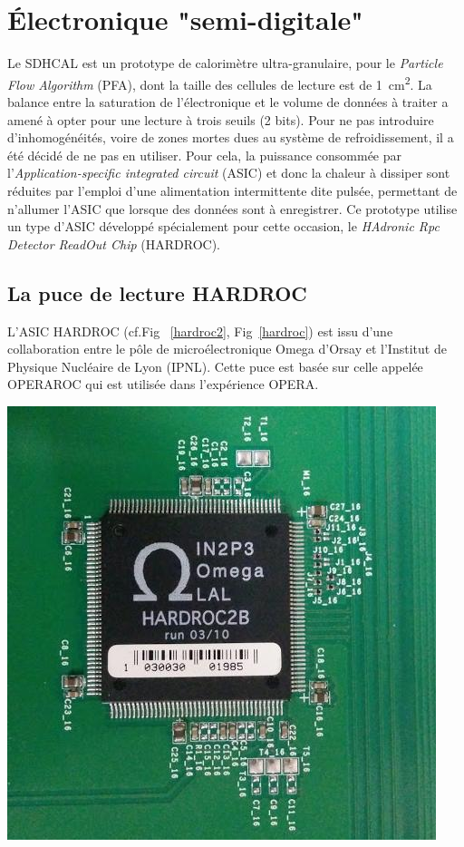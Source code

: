 \section{Électronique "semi-digitale"}
Le SDHCAL est un prototype de calorimètre ultra-granulaire, pour le \textit{Particle Flow Algorithm} (PFA), dont la taille des cellules de lecture est de \SI{1}{\square\centi\meter}. La balance entre la saturation de l'électronique et le volume de données à traiter a amené à opter pour une lecture à trois seuils (\num{2} bits). Pour ne pas introduire d'inhomogénéités, voire de zones mortes dues au système de refroidissement, il a été décidé de ne pas en utiliser. Pour cela, la puissance consommée par l'\textit{Application-specific integrated circuit} (ASIC) et donc la chaleur à dissiper sont réduites par l'emploi d'une alimentation intermittente dite pulsée, permettant de n'allumer l'ASIC que lorsque des données sont à enregistrer. Ce prototype utilise un type d'ASIC développé spécialement pour cette occasion, le \textit{HAdronic Rpc Detector ReadOut Chip }(HARDROC)\cite{Dulucq:2010ssa}.

\subsection{La puce de lecture HARDROC}
L'ASIC HARDROC (cf.Fig~ \ref{hardroc2}, Fig~\ref{hardroc}) est issu d'une collaboration entre le pôle de microélectronique Omega d'Orsay et l'Institut de Physique Nucléaire de Lyon (IPNL). Cette puce est basée sur celle appelée OPERAROC qui est utilisée dans l'expérience OPERA.

\marginpar
{
	\centering
	\includegraphics[width=\marginparwidth]{GLA/hardroc2.jpg}
	\label{hardroc2}
}


